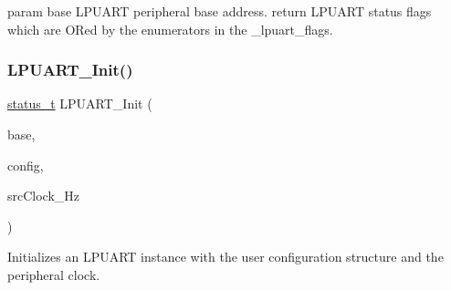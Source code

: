 param base L\+P\+U\+A\+RT peripheral base address. return L\+P\+U\+A\+RT status flags which are O\+Red by the enumerators in the \+\_\+lpuart\+\_\+flags. \mbox{\label{group__lpuart__driver_ga26ce3e5d63d8dd5d317a83f22af9682c}} 
\subsubsection{\texorpdfstring{LPUART\_Init()}{LPUART\_Init()}}
{\footnotesize\ttfamily \mbox{\hyperlink{group__ksdk__common_gaaabdaf7ee58ca7269bd4bf24efcde092}{status\+\_\+t}} L\+P\+U\+A\+R\+T\+\_\+\+Init (\begin{DoxyParamCaption}\item[{\mbox{\hyperlink{struct_l_p_u_a_r_t___type}{L\+P\+U\+A\+R\+T\+\_\+\+Type}} $\ast$}]{base,  }\item[{const \mbox{\hyperlink{group__lpuart__driver_ga35757fcc752984cb90dafc2e815c3d05}{lpuart\+\_\+config\+\_\+t}} $\ast$}]{config,  }\item[{uint32\+\_\+t}]{src\+Clock\+\_\+\+Hz }\end{DoxyParamCaption})}



Initializes an L\+P\+U\+A\+RT instance with the user configuration structure and the peripheral clock. 

